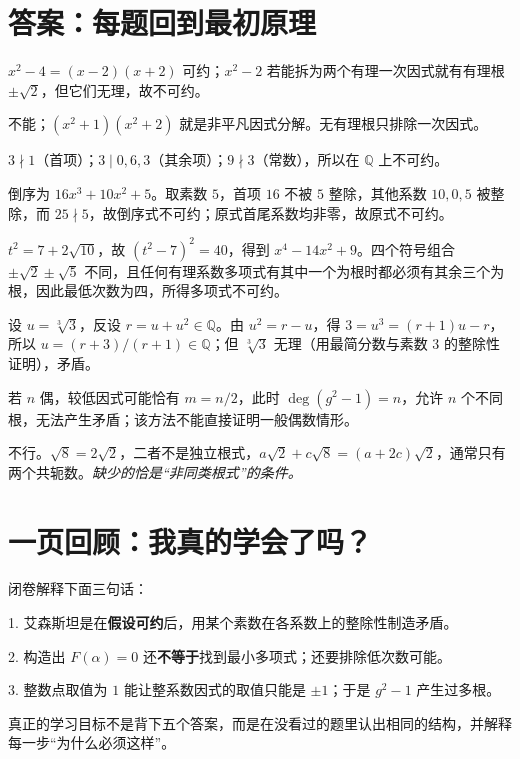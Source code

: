 \documentclass[12pt,a4paper,UTF8,fontset=none]{ctexart}
\begin{document}
\section{答案：每题回到最初原理}
 $x^2-4=(x-2)(x+2)$ 可约；$x^2-2$ 若能拆为两个有理一次因式就有有理根 $\pm\sqrt2$，但它们无理，故不可约。

 不能；$(x^2+1)(x^2+2)$ 就是非平凡因式分解。无有理根只排除一次因式。

 $3\nmid1$（首项）；$3\mid0,6,3$（其余项）；$9\nmid3$（常数），所以在 $\mathbb Q$ 上不可约。

 倒序为 $16x^3+10x^2+5$。取素数 $5$，首项 $16$ 不被 $5$ 整除，其他系数 $10,0,5$ 被整除，而 $25\nmid5$，故倒序式不可约；原式首尾系数均非零，故原式不可约。

 $t^2=7+2\sqrt{10}$，故 $(t^2-7)^2=40$，得到 $x^4-14x^2+9$。四个符号组合 $\pm\sqrt2\pm\sqrt5$ 不同，且任何有理系数多项式有其中一个为根时都必须有其余三个为根，因此最低次数为四，所得多项式不可约。

 设 $u=\sqrt[3]3$，反设 $r=u+u^2\in\mathbb Q$。由 $u^2=r-u$，得 $3=u^3=(r+1)u-r$，所以 $u=(r+3)/(r+1)\in\mathbb Q$；但 $\sqrt[3]3$ 无理（用最简分数与素数 $3$ 的整除性证明），矛盾。

 若 $n$ 偶，较低因式可能恰有 $m=n/2$，此时 $\deg(g^2-1)=n$，允许 $n$ 个不同根，无法产生矛盾；该方法不能直接证明一般偶数情形。

 不行。$\sqrt8=2\sqrt2$，二者不是独立根式，$a\sqrt2+c\sqrt8=(a+2c)\sqrt2$，通常只有两个共轭数。\emph{缺少的恰是“非同类根式”的条件。}

\section{一页回顾：我真的学会了吗？}
\begin{takeawaybox}
闭卷解释下面三句话：\par
1. 艾森斯坦是在\textbf{假设可约}后，用某个素数在各系数上的整除性制造矛盾。\par
2. 构造出 $F(\alpha)=0$ 还\textbf{不等于}找到最小多项式；还要排除低次数可能。\par
3. 整数点取值为 $1$ 能让整系数因式的取值只能是 $\pm1$；于是 $g^2-1$ 产生过多根。
\end{takeawaybox}

真正的学习目标不是背下五个答案，而是在没看过的题里认出相同的结构，并解释每一步“为什么必须这样”。
\end{document}
